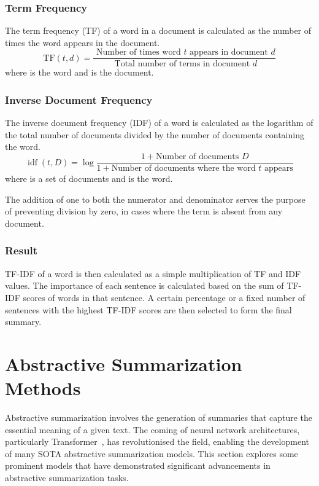 \documentclass[english, ba, kiv, he, iso690numb, pdf, viewonly]{fasthesis}
\begin{document}
\subsubsection{Term Frequency}
The term frequency (TF) of a word in a document is calculated as the number of times the word appears in the document. 
$$
\mathrm{TF}(t, d)=\frac{\text { Number of times word } t \text { appears in document } d}{\text { Total number of terms in document } d}
$$
where  is the word and  is the document.

\subsubsection{Inverse Document Frequency}
The inverse document frequency (IDF) of a word is calculated as the logarithm of the total number of documents divided by the number of documents containing the word.
$$
\operatorname{idf}(t, D)=\log \frac{1 + \text{Number of documents } D}{1 + \text{Number of documents where the word } t \text{ appears}}
$$
where  is a set of documents and  is the word.

The addition of one to both the numerator and denominator serves the purpose of preventing division by zero, in cases where the term  is absent from any document.

\subsubsection{Result}
TF-IDF of a word  is then calculated as a simple multiplication of TF and IDF values. 
The importance of each sentence is calculated based on the sum of TF-IDF scores of words in that sentence. A certain percentage or a fixed number of sentences with the highest TF-IDF scores are then selected to form the final summary.

\section{Abstractive Summarization Methods}
Abstractive summarization involves the generation of summaries that capture the essential meaning of a given text. The coming of neural network architectures, particularly Transformer~\cite{vaswani2023attention}, has revolutionised the field, enabling the development of many SOTA abstractive summarization models. This section explores some prominent models that have demonstrated significant advancements in abstractive summarization tasks.
\end{document}
